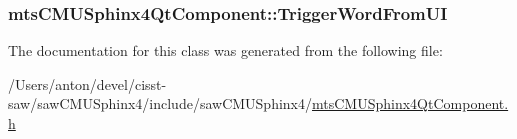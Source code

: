 \subsubsection[{Trigger\+Word\+From\+U\+I}]{ mts\+C\+M\+U\+Sphinx4\+Qt\+Component\+::\+Trigger\+Word\+From\+U\+I\hspace{0.3cm}{\ttfamily [protected]}}\label{classmts_c_m_u_sphinx4_qt_component_a3d2e5606f0e3d92278f42b020bfec766}


The documentation for this class was generated from the following file\+:\begin{DoxyCompactItemize}
\item 
/\+Users/anton/devel/cisst-\/saw/saw\+C\+M\+U\+Sphinx4/include/saw\+C\+M\+U\+Sphinx4/\hyperlink{mts_c_m_u_sphinx4_qt_component_8h}{mts\+C\+M\+U\+Sphinx4\+Qt\+Component.\+h}\end{DoxyCompactItemize}
